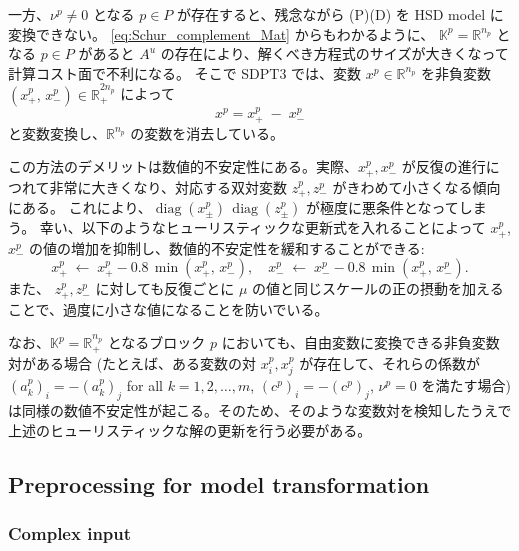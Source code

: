 \documentclass{jsarticle}
\begin{document}
\medskip

一方、$\nu^p\neq 0$ となる $p\in P$ が存在すると、残念ながら (P)(D) を HSD model に変換できない。
\eqref{eq:Schur_complement_Mat} からもわかるように、
$\mathbb{K}^p = \mathbb{R}^{n_p}$ となる $p\in P$ があると $A^u$ の存在により、解くべき方程式のサイズが大きくなって計算コスト面で不利になる。
そこで SDPT3 では、変数 $x^p\in \mathbb{R}^{n_p}$ を非負変数 $(x^p_+,\,x^p_-)\in\mathbb{R}^{2n_p}_+$ によって
\[
   x^p = x^p_+ \;-\; x^p_- 
\]
と変数変換し、$\mathbb{R}^{n_p}$ の変数を消去している。

この方法のデメリットは数値的不安定性にある。実際、$x^p_+, x^p_-$ が反復の進行につれて非常に大きくなり、対応する双対変数 $z^p_+, z^p_-$ がきわめて小さくなる傾向にある。
これにより、$\operatorname{diag}(x^p_\pm)\,\operatorname{diag}(z^p_\pm)$ が極度に悪条件となってしまう。
幸い、以下のようなヒューリスティックな更新式を入れることによって $x^p_+$, $x^p_-$ の値の増加を抑制し、数値的不安定性を緩和することができる:
\[
   x^p_+ \;\leftarrow\; x^p_+ - 0.8\,\min(x^p_+,\,x^p_-),
   \quad
   x^p_- \;\leftarrow\; x^p_- - 0.8\,\min(x^p_+,\,x^p_-).
\]
また、 $z^p_+, z^p_-$ に対しても反復ごとに $\mu$ の値と同じスケールの正の摂動を加えることで、過度に小さな値になることを防いでいる。

\medskip

なお、$\mathbb{K}^p=\mathbb{R}^{n_p}_+$ となるブロック $p$ においても、自由変数に変換できる非負変数対がある場合 (たとえば、ある変数の対 $x^p_i, x^p_j$ が存在して、それらの係数が $(a^p_k)_i = -(a^p_k)_j$ for all $k=1,2,\ldots,m$, $(c^p)_i = -(c^p)_j$, $\nu^p = 0$ を満たす場合) は同様の数値不安定性が起こる。そのため、そのような変数対を検知したうえで上述のヒューリスティックな解の更新を行う必要がある。


\subsection{Preprocessing for model transformation}

\subsubsection{Complex input}
\end{document}
